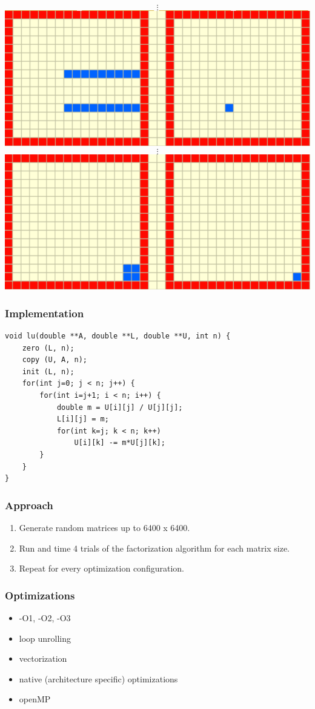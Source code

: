 \documentclass{beamer}
\begin{document}
\begin{frame}
\begin{center}
$$\vdots$$
\includegraphics[scale=0.2]{figures/lu6}
$$\vdots$$
\includegraphics[scale=0.2]{figures/lu7}
\end{center}

\end{frame}


\begin{frame}[fragile]
\frametitle{Implementation}

\begin{lstlisting}
void lu(double **A, double **L, double **U, int n) {
    zero (L, n);
    copy (U, A, n);
    init (L, n);
    for(int j=0; j < n; j++) {
        for(int i=j+1; i < n; i++) {
            double m = U[i][j] / U[j][j];
            L[i][j] = m;
            for(int k=j; k < n; k++)
                U[i][k] -= m*U[j][k];
        }
    }
}
\end{lstlisting}

\end{frame}

\begin{frame}
\frametitle{Approach}
\begin{enumerate}
\item Generate random matrices up to 6400 x 6400.
\item Run and time 4 trials of the factorization algorithm for each matrix size.
\item Repeat for every optimization configuration.
\end{enumerate}
\end{frame}

\begin{frame}
\frametitle{Optimizations}

\begin{itemize}
\item -O1, -O2, -O3
\item loop unrolling
\item vectorization
\item native (architecture specific) optimizations
\item openMP
\end{itemize}

\end{frame}
\end{document}
